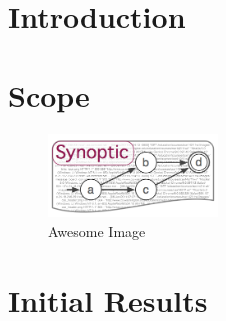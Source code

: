\documentclass{article}
\begin{document}
\section{Introduction}
\cite{schneider2010synoptic}

\section{Scope}

\begin{figure}[b]
    \centering
    \includegraphics[width=0.4\textwidth]{./figures/TBD.jpg}
    \caption{Awesome Image}
    \label{fig:awesome_image}
\end{figure}


\section{Initial Results}




\end{document}
